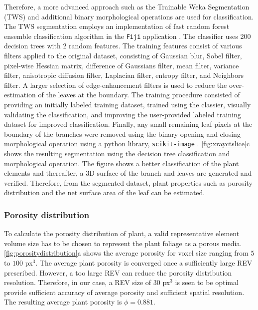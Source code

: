 Therefore, a more advanced approach such as the Trainable Weka Segmentation (TWS) \citep{Arganda-Carreras2017} and additional binary morphological operations are used for classification. The TWS segmentation employs an implementation of fast random forest ensemble classification algorithm in the \texttt{Fiji} application \citep{Schindelin2012a}. The classifier uses 200 decision trees with 2 random features. The training features consist of various filters applied to the original dataset, consisting of Gaussian blur, Sobel filter, pixel-wise Hessian matrix, difference of Gaussians filter, mean filter, variance filter, anisotropic diffusion filter, Laplacian filter, entropy filter, and Neighbors filter. A larger selection of edge-enhancement filters is used to reduce the over-estimation of the leaves at the boundary. The training procedure consisted of providing an initially labeled training dataset, trained using the classier, visually validating the classification, and improving the user-provided labeled training dataset for improved classification. Finally, any small remaining leaf pixels at the boundary of the branches were removed using the binary opening and closing morphological operation using a python library, \texttt{scikit-image} \citep{VanderWalt2014a}. \cref{fig:xrayctslice}c shows the resulting segmentation using the decision tree classification and morphological operation. The figure shows a better classification of the plant elements and thereafter, a 3D surface of the branch and leaves are generated and verified. Therefore, from the segmented dataset, plant properties such as porosity distribution and the net surface area of the leaf can be estimated. 

\subsubsection*{Porosity distribution} 

To calculate the porosity distribution of plant, a valid representative element volume size has to be chosen to represent the plant foliage as a porous media. \cref{fig:porositydistribution}a shows the average porosity for voxel size ranging from $5$ to $100$ px$^3$. The average plant porosity is converged once a sufficiently large REV prescribed. However, a too large REV can reduce the porosity distribution resolution. Therefore, in our case, a REV size of $30$ px$^3$ is seen to be optimal provide sufficient accuracy of average porosity and sufficient spatial resolution. The resulting average plant porosity is $\phi= 0.881$. 

